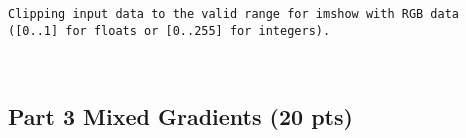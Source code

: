 \documentclass[11pt]{article}
\begin{document}
    \begin{Verbatim}[commandchars=\\\{\}]
Clipping input data to the valid range for imshow with RGB data ([0..1] for floats or [0..255] for integers).

    \end{Verbatim}

    \begin{center}
    \end{center}
    { \hspace*{\fill} \\}
    
    \subsection{Part 3 Mixed Gradients (20
pts)}\label{part-3-mixed-gradients-20-pts}
\end{document}
